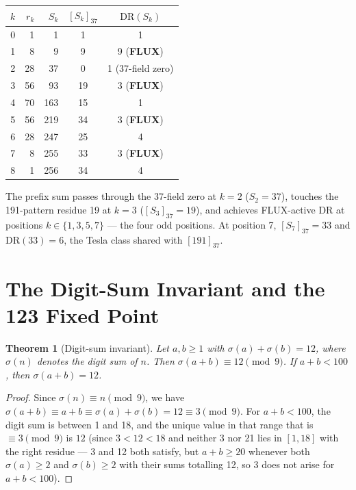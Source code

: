 \documentclass[12pt]{article}
\newtheorem{theorem}{Theorem}[section]
\begin{document}
\begin{center}
\begin{tabular}{rrrcc}
\toprule
$k$ & $r_k$ & $S_k$ & $[S_k]_{37}$ & $\mathrm{DR}(S_k)$ \\
\midrule
0 & 1  &   1 &  1 & 1 \\
1 & 8  &   9 &  9 & 9 (\textbf{FLUX}) \\
2 & 28 &  37 &  0 & 1 (37-field zero) \\
3 & 56 &  93 & 19 & 3 (\textbf{FLUX}) \\
4 & 70 & 163 & 15 & 1 \\
5 & 56 & 219 & 34 & 3 (\textbf{FLUX}) \\
6 & 28 & 247 & 25 & 4 \\
7 & 8  & 255 & 33 & 3 (\textbf{FLUX}) \\
8 & 1  & 256 & 34 & 4 \\
\bottomrule
\end{tabular}
\end{center}

The prefix sum passes through the 37-field zero at $k=2$ ($S_2=37$),
touches the 191-pattern residue 19 at $k=3$ ($[S_3]_{37}=19$), and
achieves FLUX-active DR at positions $k\in\{1,3,5,7\}$ --- the four
odd positions.  At position 7, $[S_7]_{37}=33$ and $\mathrm{DR}(33)=6$,
the Tesla class shared with $[191]_{37}$.

\section{The Digit-Sum Invariant and the 123 Fixed Point}
\label{sec:digitsum}

\begin{theorem}[Digit-sum invariant]
\label{thm:digitsum}
Let $a, b \geq 1$ with $\sigma(a) + \sigma(b) = 12$, where $\sigma(n)$
denotes the digit sum of $n$.  Then $\sigma(a+b) \equiv 12 \pmod{9}$.
If $a+b < 100$, then $\sigma(a+b) = 12$.
\end{theorem}

\begin{proof}
Since $\sigma(n) \equiv n \pmod{9}$, we have $\sigma(a+b) \equiv a+b
\equiv \sigma(a)+\sigma(b) = 12 \equiv 3 \pmod{9}$.  For $a+b < 100$,
the digit sum is between 1 and 18, and the unique value in that range
that is $\equiv 3\pmod 9$ is $12$ (since $3<12<18$ and neither 3 nor
21 lies in $[1,18]$ with the right residue --- 3 and 12 both satisfy,
but $a+b\geq 20$ whenever both $\sigma(a)\geq 2$ and $\sigma(b)\geq 2$
with their sums totalling 12, so 3 does not arise for $a+b<100$).
\end{proof}
\end{document}
